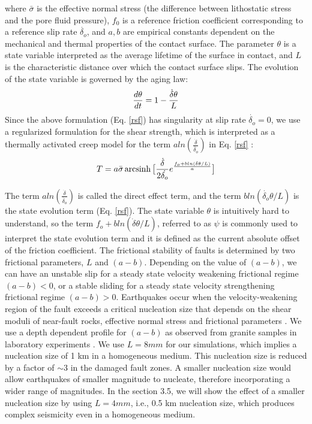 \documentclass[11pt]{article}
\DeclareMathOperator{\arcsinh}{arcsinh}
\begin{document}
where $\bar{\sigma}$ is the effective normal stress (the difference between lithostatic stress and the pore fluid pressure), $f_0$ is a reference friction coefficient corresponding to a reference slip rate $\dot{\delta_o}$, and $a, b$ are empirical constants dependent on the mechanical and thermal properties of the contact surface. The parameter $\theta$ is a state variable interpreted as the average lifetime of the surface in contact, and $L$ is the characteristic distance over which the contact surface slips. The evolution of the state variable is governed by the aging law:
\begin{align}
    \centering
    \frac{d\theta}{dt} = 1 - \frac{\dot{\delta}\theta}{L}
    \label{rsf_evolution}
\end{align}
Since the above formulation (Eq. \ref{rsf}) has singularity at slip rate $\dot{\delta_o} =0$, we use a regularized formulation for the shear strength, which is interpreted as a thermally activated creep model for the term $aln(\frac{\dot{\delta}}{\dot{\delta_o}})$ in Eq. \ref{rsf} \citep{rice_benzion_1996, lapusta_2000}:
\begin{align}
    \centering
    T = a\bar{\sigma}\arcsinh\big[\frac{\dot{\delta}}{2\dot{\delta_o}}e^{\frac{f_o + bln(\dot{\delta}\theta/L)}{a}} \big]
\end{align}

The term $aln(\frac{\dot{\delta}}{\dot{\delta_o}})$ is called the direct effect term, and the term $bln(\dot{\delta_o} \theta/L)$ is the state evolution term (Eq. \ref{rsf}). The state variable $\theta$ is intuitively hard to understand, so the term $f_o+bln(\dot{\delta}\theta/L)$, referred to as $\psi$ is commonly used to interpret the state evolution term and it is defined as the current absolute offset of the friction coefficient. The frictional stability of faults is determined by two frictional parameters, $L$ and $(a-b)$. Depending on the value of $(a-b)$, we can have an unstable slip for a steady state velocity weakening frictional regime $(a-b)<0$, or a stable sliding for a steady state velocity strengthening frictional regime $(a-b)>0$. Earthquakes occur when the velocity-weakening region of the fault exceeds a critical nucleation size that depends on the shear moduli of near-fault rocks, effective normal stress and frictional parameters \citep{rice_1993, rubin_ampuero_2005}. We use a depth dependent profile for $(a-b)$ as observed from granite samples in laboratory experiments \citep{blanpied_1991, blanpied_1995}.  We use $L = 8mm$ for our simulations, which implies a nucleation size of 1 km in a homogeneous medium. This nucleation size is reduced by a factor of $\sim 3$ in the damaged fault zones. A smaller nucleation size would allow earthquakes of smaller magnitude to nucleate, therefore incorporating a wider range of magnitudes. In the section 3.5, we will show the effect of a smaller nucleation size by using $L = 4mm$, i.e., 0.5 km nucleation size, which produces complex seismicity even in a homogeneous medium. 
\end{document}
